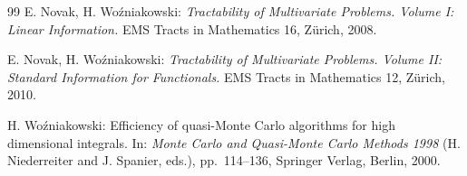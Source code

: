 \documentclass[12pt]{article}
\begin{document}
\begin{thebibliography}{99}
 E. Novak, H. Wo\'{z}niakowski: {\em Tractability of Multivariate Problems. Volume I: Linear Information.} EMS Tracts in Mathematics 16, Z\"urich, 2008.

 E. Novak, H. Wo\'{z}niakowski: {\em Tractability of Multivariate Problems. Volume II: Standard Information for Functionals.} EMS Tracts in Mathematics 12, Z\"urich, 2010.

 H. Wo\'{z}niakowski: Efficiency of quasi-Monte Carlo algorithms for high dimensional integrals. In: {\em Monte Carlo and Quasi-Monte Carlo Methods 1998} (H. Niederreiter and J. Spanier, eds.), pp.~114--136, Springer Verlag, Berlin, 2000.

\end{thebibliography}
\end{document}
